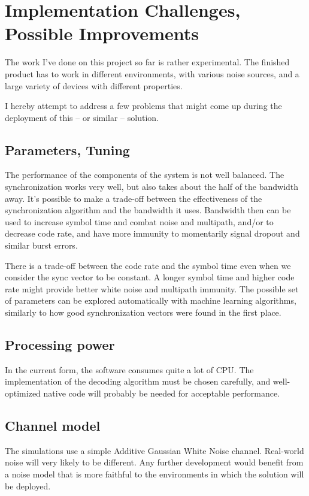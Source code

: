 \documentclass[a4paper]{article}
\begin{document}
\section{Implementation Challenges, Possible Improvements}

The work I've done on this project so far is rather experimental. The 
finished product has to work in different environments, with various
noise sources, and a large variety of devices with different
properties.

I hereby attempt to address a few problems that might come up during 
the deployment of this -- or similar -- solution.

\subsection{Parameters, Tuning}

The performance of the components of the system is not well balanced.
The synchronization works very well, but also takes about the half of
the bandwidth away. It's possible to make a trade-off between the
effectiveness of the synchronization algorithm and the bandwidth it
uses. Bandwidth then can be used to increase symbol time and combat
noise and multipath, and/or to decrease code rate, and have more
immunity to momentarily signal dropout and similar burst errors.

There is a trade-off between the code rate and the symbol time even when
we consider the sync vector to be constant. A longer symbol time and
higher code rate might provide better white noise and multipath
immunity. The possible set of parameters can be explored automatically
with machine learning algorithms, similarly to how good synchronization
vectors were found in the first place.

\subsection{Processing power}

In the current form, the software consumes quite a lot of CPU. The
implementation of the decoding algorithm must be chosen carefully, and
well-optimized native code will probably be needed for acceptable
performance.

\subsection{Channel model}

The simulations use a simple Additive Gaussian White Noise channel.
Real-world noise will very likely to be different. Any further
development would benefit from a noise model that is more faithful to
the environments in which the solution will be deployed.
\end{document}
